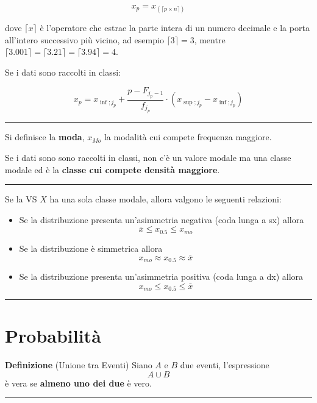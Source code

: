 \documentclass[
  11pt,
]{book}
\providecommand{\tightlist}{%
  \setlength{\itemsep}{0pt}\setlength{\parskip}{0pt}}
\theoremstyle{mytheoremstyle}
\theoremstyle{mydefstyle}
\begin{document}
\[
x_p = x_{(\lceil {p\times n}\rceil)}
\]

dove \(\lceil x\rceil\) è l'operatore che estrae la parte intera di un numero decimale e la porta all'intero successivo più vicino, ad esempio \(\lceil 3 \rceil = 3\), mentre \(\lceil 3.001\rceil=\lceil 3.21\rceil=\lceil 3.94\rceil=4\).

Se i dati sono raccolti in classi:

\[x_{p}=x_{\inf;j_p}+\frac{p-F_{j_p-1}}{f_{j_p}}\cdot \left(x_{\sup;j_p}-x_{\inf;j_p} \right)\]

\begin{center}\rule{0.5\linewidth}{0.5pt}\end{center}

Si definisce la \textbf{moda}, \(x_{Mo}\) la modalità cui compete frequenza maggiore.

Se i dati sono sono raccolti in classi, non c'è un valore modale ma una classe modale ed è la \textbf{classe cui compete densità maggiore}.

\begin{center}\rule{0.5\linewidth}{0.5pt}\end{center}

Se la VS \(X\) ha una sola classe modale, allora valgono le seguenti relazioni:

\begin{itemize}
\tightlist
\item
  Se la distribuzione presenta un'asimmetria negativa (coda lunga a sx) allora
  \[\bar x\le  x_{0.5} \le x_{mo}\]
\item
  Se la distribuzione è simmetrica allora
  \[x_{mo}\approx x_{0.5}\approx \bar x\]
\item
  Se la distribuzione presenta un'asimmetria positiva (coda lunga a dx) allora
  \[x_{mo}\le x_{0.5}\le \bar x\]
\end{itemize}

\begin{center}\rule{0.5\linewidth}{0.5pt}\end{center}

\section{Probabilità}\label{probabilituxe0}

\textbf{Definizione} (Unione tra Eventi)
Siano \(A\) e \(B\) due eventi, l'espressione \[
A\cup B
\] è vera se \textbf{almeno uno dei due} è vero.

\begin{center}\rule{0.5\linewidth}{0.5pt}\end{center}
\end{document}
